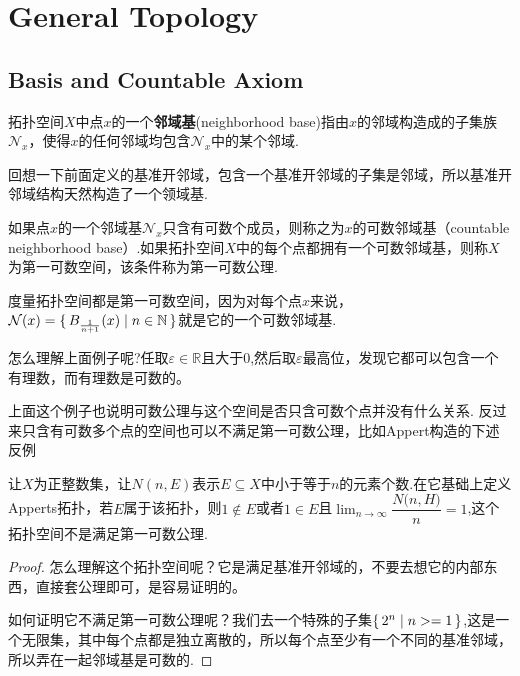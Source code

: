 \newpage
\section{General Topology}
\subsection{Basis and Countable Axiom}

\begin{definition}
拓扑空间$X$中点$x$的一个\textbf{邻域基}(neighborhood base)指由$x$的邻域构造成的子集族$\mathcal{N}_x$，使得$x$的任何邻域均包含$\mathcal{N}_x$中的某个邻域.
\end{definition}

回想一下前面定义的基准开邻域，包含一个基准开邻域的子集是邻域，所以基准开邻域结构天然构造了一个领域基.

\begin{definition}
如果点$x$的一个邻域基$\mathcal{N}_x$只含有可数个成员，则称之为$x$的可数邻域基（countable neighborhood base）.如果拓扑空间$X$中的每个点都拥有一个可数邻域基，则称$X$为第一可数空间，该条件称为第一可数公理.
\end{definition}

\begin{example}
度量拓扑空间都是第一可数空间，因为对每个点$x$来说，$\mathcal{N}(x)=\{\,B_{\frac{1}{n+1}}(x)\mid n\in \mathbb{N}\,\}$就是它的一个可数邻域基.
\end{example}

怎么理解上面例子呢?任取$\varepsilon \in \mathbb{R}$且大于0,然后取$\varepsilon$最高位，发现它都可以包含一个有理数，而有理数是可数的。

上面这个例子也说明可数公理与这个空间是否只含可数个点并没有什么关系. 反过来只含有可数多个点的空间也可以不满足第一可数公理，比如Appert构造的下述反例

\begin{example}
让$X$为正整数集，让$N(n,E)$表示$E \subseteq X$中小于等于$n$的元素个数.在它基础上定义Apperts拓扑，若$E$属于该拓扑，则$1 \notin E$或者$1 \in E$且$\displaystyle \lim_{n \mathop \to \infty} \dfrac {{N}{(n, H}) } n = 1$,这个拓扑空间不是满足第一可数公理.
\end{example}

\begin{proof}
怎么理解这个拓扑空间呢？它是满足基准开邻域的，不要去想它的内部东西，直接套公理即可，是容易证明的。

如何证明它不满足第一可数公理呢？我们去一个特殊的子集$\{\,2^n\mid n>=1\,\}$,这是一个无限集，其中每个点都是独立离散的，所以每个点至少有一个不同的基准邻域，所以弄在一起邻域基是可数的.
\end{proof}


